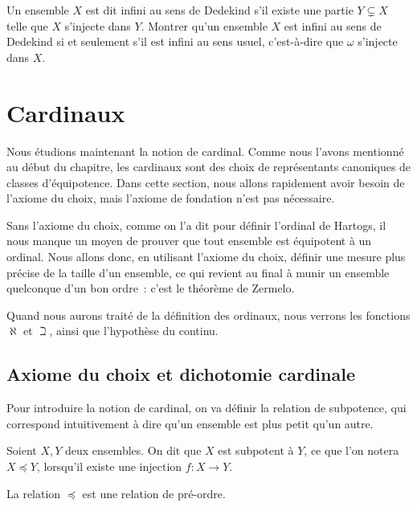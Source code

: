 \begin{exercise}
  Un ensemble $X$ est dit infini au sens de Dedekind s'il existe une partie
  $Y\subsetneq X$ telle que $X$ s'injecte dans $Y$. Montrer qu'un ensemble $X$
  est infini au sens de Dedekind si et seulement s'il est infini au sens usuel,
  c'est-à-dire que $\omega$ s'injecte dans $X$.
\end{exercise}

\section{Cardinaux}

Nous étudions maintenant la notion de cardinal. Comme nous l'avons mentionné
au début du chapitre, les cardinaux sont des choix de représentants canoniques
de classes d'équipotence. Dans cette section, nous allons rapidement avoir
besoin de l'axiome du choix, mais l'axiome de fondation n'est pas nécessaire.

Sans l'axiome du choix, comme on l'a dit pour définir l'ordinal de Hartogs, il
nous manque un moyen de prouver que tout ensemble est équipotent à un ordinal.
Nous allons donc, en utilisant l'axiome du choix, définir une mesure plus
précise de la taille d'un ensemble, ce qui revient au final à munir un ensemble
quelconque d'un bon ordre~: c'est le théorème de Zermelo.

Quand nous aurons traité de la définition des ordinaux, nous verrons les
fonctions $\aleph$ et $\beth$, ainsi que l'hypothèse du continu.

\subsection{Axiome du choix et dichotomie cardinale}

Pour introduire la notion de cardinal, on va définir la relation de subpotence,
qui correspond intuitivement à dire qu'un ensemble est plus petit qu'un autre.

\begin{definition}[Subpotence]
  Soient $X,Y$ deux ensembles. On dit que $X$ est subpotent à $Y$, ce que l'on
  notera $X\preceq Y$, lorsqu'il existe une injection $f : X \to Y$.
\end{definition}

\begin{property}
  La relation $\preceq$ est une relation de pré-ordre.
\end{property}

